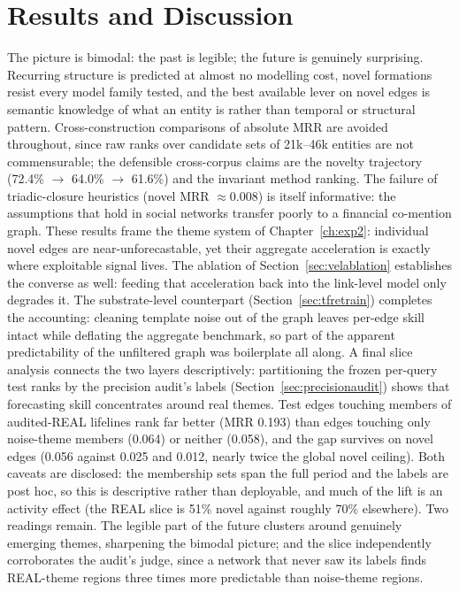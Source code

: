 \documentclass[a4paper,12pt]{report}
\begin{document}
\section{Results and Discussion}
The picture is bimodal: the past is legible; the future is genuinely
surprising. Recurring structure is predicted at almost no modelling
cost, novel formations
resist every model family tested, and the best available lever on novel edges
is semantic knowledge of what an entity is rather than temporal or
structural pattern. Cross-construction comparisons of absolute MRR are
avoided throughout, since raw ranks over candidate sets of 21k--46k entities
are not commensurable; the defensible cross-corpus claims are the novelty
trajectory (72.4\% $\rightarrow$ 64.0\% $\rightarrow$ 61.6\%) and the
invariant method ranking. The failure of triadic-closure heuristics
(novel MRR $\approx 0.008$) is itself informative: the assumptions that hold
in social networks transfer poorly to a financial co-mention graph. These
results frame the theme system of Chapter~\ref{ch:exp2}: individual novel
edges are near-unforecastable, yet their aggregate acceleration is exactly
where exploitable signal lives. The ablation of
Section~\ref{sec:velablation} establishes the converse as well: feeding
that acceleration back into the link-level model only degrades it. The
substrate-level counterpart (Section~\ref{sec:tfretrain}) completes the
accounting: cleaning template noise out of the graph leaves per-edge
skill intact while deflating the aggregate benchmark, so part of the
apparent predictability of the unfiltered graph was boilerplate all
along. A final
slice analysis connects the two layers descriptively: partitioning the
frozen per-query test ranks by the precision audit's labels
(Section~\ref{sec:precisionaudit}) shows that forecasting skill
concentrates around real themes. Test edges touching members of
audited-REAL lifelines rank far better (MRR 0.193) than edges touching
only noise-theme members (0.064) or neither (0.058), and the gap survives
on novel edges (0.056 against 0.025 and 0.012, nearly twice the global
novel ceiling). Both caveats are disclosed: the membership sets span the
full period and the labels are post hoc, so this is descriptive rather
than deployable, and much of the lift is an activity effect (the REAL
slice is 51\% novel against roughly 70\% elsewhere). Two readings remain.
The legible part of the future clusters around genuinely emerging themes,
sharpening the bimodal picture; and the slice independently corroborates
the audit's judge, since a network that never saw its labels finds
REAL-theme regions three times more predictable than noise-theme regions.
\end{document}

